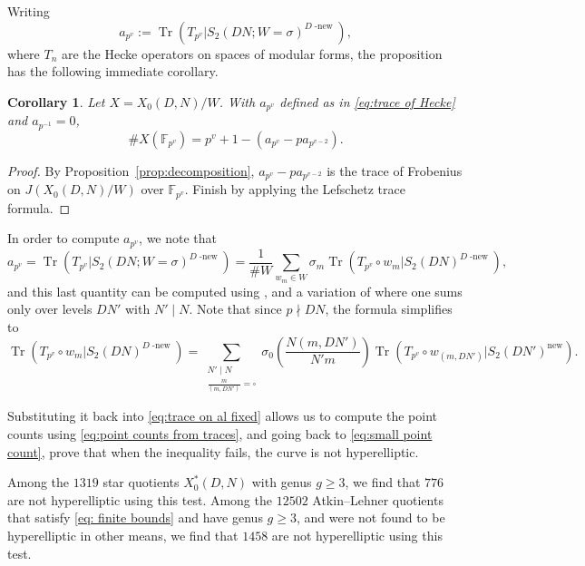 \documentclass[12pt]{amsart}
\newcommand{\F}{\mathbb{F}}
\DeclareMathOperator{\new}{new}
\DeclareMathOperator{\Tr}{Tr}
\newcommand{\Dnew}{D\operatorname{-new}}
\numberwithin{equation}{subsection}
\theoremstyle{plain}\newtheorem{ithm}{Theorem}
\theoremstyle{plain}\newtheorem{iprop}[ithm]{Proposition}
\newtheorem{corollary}[equation]{Corollary}
\theoremstyle{definition}
\theoremstyle{remark}
\newcommand{\Curve}[2]{X_0({#1},{#2})} %
\newcommand{\StarCurve}[2]{X_0^*({#1},{#2})} %
\begin{document}
Writing 
\begin{equation} \label{eq:trace of Hecke}
a_{p^v} := \Tr \left( T_{p^v} | S_2(DN; W = \sigma)^{\Dnew} \right),
\end{equation}
where $T_n$ are the Hecke operators on spaces of modular forms, the proposition has the following immediate corollary.

\begin{corollary}
Let $X = \Curve{D}{N} / W$.
With $a_{p^v}$ defined as in \eqref{eq:trace of Hecke} and $a_{p^{-1}} = 0$, 
\begin{equation} \label{eq:point counts from traces}
    \# X(\F_{p^v}) = p^v + 1 - (a_{p^v} - p a_{p^{v-2}}).
\end{equation}
\end{corollary}

\begin{proof}
    By Proposition~\ref{prop:decomposition}, $a_{p^v} - p a_{p^{v-2}}$ is the trace of Frobenius on $J(\Curve{D}{N}/W)$ over $\F_{p^v}$. Finish by applying the Lefschetz trace formula.
\end{proof}

In order to compute $a_{p^v}$, we note that 
\begin{equation} \label{eq:trace on al fixed}
a_{p^v} = \Tr \left( T_{p^v} | S_2(DN; W = \sigma)^{\Dnew} \right)
= \frac{1}{\# W} \sum_{w_m \in W} \sigma_m  \Tr
\left( T_{p^v} \circ w_m| S_2(DN)^{\Dnew}  \right),
\end{equation}
and this last quantity can be computed using \cite[Corollary 5.5]{Assaf}, and a variation of \cite[Lemma 4.20]{Assaf} where one sums only over levels $DN'$ with $N' \mid N$. Note that since $p \nmid DN$, the formula simplifies to
$$
\Tr( T_{p^v} \circ w_m | S_2(DN)^{\Dnew} )
= \sum_{\substack{N' \mid N \\ \frac{m}{(m,DN')} = \square}}
\sigma_0 \left( \frac{N(m,DN')}{N'm} \right) \Tr( T_{p^v} \circ w_{(m,DN')} | S_2(DN')^{\new} ).
$$

Substituting it back into \eqref{eq:trace on al fixed} allows us to compute the point counts using \eqref{eq:point counts from traces}, and going back to \eqref{eq:small point count}, prove that when the inequality fails, the curve is not hyperelliptic.

Among the $1319$ star quotients $\StarCurve{D}{N}$ with genus $g \ge 3$, we find that $776$ are not hyperelliptic using this test. Among the $12502$ Atkin--Lehner quotients that satisfy \eqref{eq: finite bounds} and have genus $g \ge 3$, and were not found to be hyperelliptic in other means, we find that $1458$ are not hyperelliptic using this test.
\end{document}
